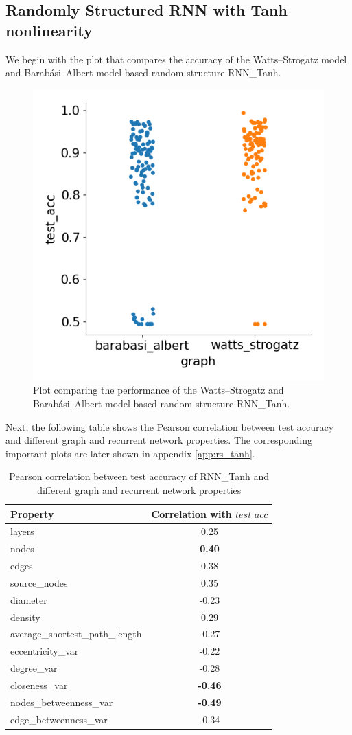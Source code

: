 \subsection{Randomly Structured RNN with Tanh nonlinearity}

We begin with the plot that compares the accuracy of the Watts–Strogatz model and Barabási–Albert model based random structure RNN\_Tanh.

\begin{figure}[h]
	\centering
	\includegraphics[width=0.45\linewidth]{images/results/random/tanh/graph_test_acc.png}
	\caption[Performance of the WS and BA based random structure RNN\_Tanh]%
	{Plot comparing the performance of the Watts–Strogatz and Barabási–Albert model based random structure RNN\_Tanh.}
	\label{fig:tanh_acc_comp}
\end{figure}

Next, the following table shows the Pearson correlation between test accuracy and different graph and recurrent network properties. The corresponding important plots are later shown in appendix \ref{app:rs_tanh}.

\begin{table}[h]
	\centering
	\begin{tabular}{|l|c|}
	    \hline
		\textbf{Property} & \textbf{Correlation with $test\_acc$}\\
		\hline
		layers & 0.25\\
		nodes & \textbf{0.40}\\
		edges & 0.38\\
		source\_nodes & 0.35\\
		diameter & -0.23\\
		density & 0.29\\
		average\_shortest\_path\_length & -0.27\\
		eccentricity\_var & -0.22\\
		degree\_var & -0.28\\
		closeness\_var & \textbf{-0.46}\\
		nodes\_betweenness\_var & \textbf{-0.49}\\
		edge\_betweenness\_var & -0.34\\
		\hline
	\end{tabular}
	\caption[Pearson correlation between test accuracy of RNN\_Tanh and different graph and recurrent network properties]{Pearson correlation between test accuracy of RNN\_Tanh and different graph and recurrent network properties}
	\label{tab:tanh_corr}
\end{table}

